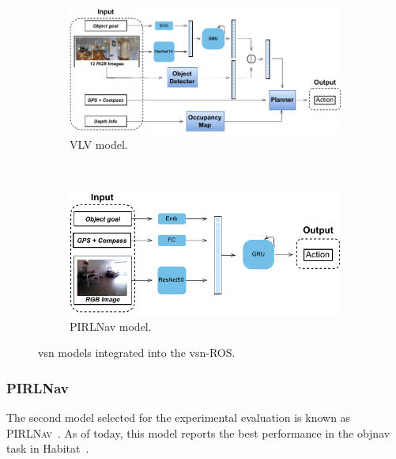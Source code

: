\begin{figure}
    \centering
    \begin{subfigure}[b]{\textwidth}
        \includegraphics[width=\textwidth]{figures/ros4vsn/vlv_diagram}
        \caption{VLV model.}
        \label{fig:vlv_overview}
    \end{subfigure}
    ~
    \begin{subfigure}[b]{\textwidth}
        \includegraphics[width=\textwidth]{figures/ros4vsn/pirlnav_diagram}
        \caption{PIRLNav model.}
        \label{fig:pirlnav_overview}
    \end{subfigure}
    \caption{\acrshort{vsn} models integrated into the \acrshort{vsn}-ROS.}\label{fig:vsn_models_overview}
\end{figure}

\subsubsection{PIRLNav}
The second model selected for the experimental evaluation is known as \textsc{PIRLNav}~\cite{ramrakhya2023}.
As of today, this model reports the best performance in the \acrshort{objnav}~\cite{batra2020} task in Habitat~\cite{NEURIPS2021_021bbc7e}.

